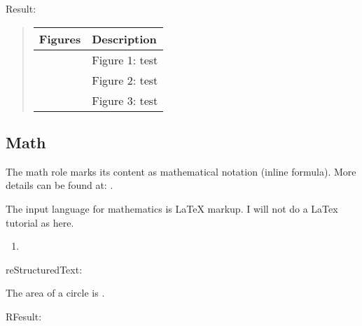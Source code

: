 \documentclass[letterpaper,11pt,english]{sphinxmanual}
\begin{document}
Result:
\begin{quote}


\begin{savenotes}\sphinxattablestart
\centering
\begin{tabulary}{\linewidth}[t]{|T|T|}
\hline
\sphinxstyletheadfamily 
Figures
&\sphinxstyletheadfamily 
Description
\\
\hline\begin{sphinxfigure-in-table}
\centering

\noindent{}
\end{sphinxfigure-in-table}\relax
&
Figure 1: test
\\
\hline
\noindent{}
&
Figure 2: test
\\
\hline
\noindent{}
&
Figure 3: test
\\
\hline
\end{tabulary}
\par
\sphinxattableend\end{savenotes}
\end{quote}


\subsection{Math}
\label{\detokenize{rtxt:math}}
The math role marks its content as mathematical notation (inline formula). More details can be found at: .

The input language for mathematics is LaTeX markup. I will not do a LaTex tutorial as here.
\begin{enumerate}
\def\theenumi{\arabic{enumi}}
\def\labelenumi{\theenumi .}
\makeatletter\def\p@enumii{\p@enumi \theenumi .}\makeatother
\item {} 

\end{enumerate}

reStructuredText:

\begin{sphinxVerbatim}[commandchars=\\\{\}]
The area of a circle is .
\end{sphinxVerbatim}

RFesult:
\end{document}
